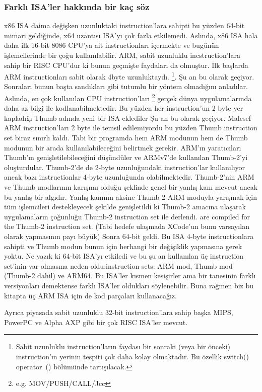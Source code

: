 %
%
%

\subsubsection{Farklı \ac{ISA}'ler hakkında bir kaç söz}
x86 \ac{ISA} daima değişken uzunluktaki instruction'lara sahipti bu yüzden 64-bit mimari geldiğinde, x64 uzantısı \ac{ISA}'yı çok fazla etkilemedi. Aslında, x86 \ac{ISA} hala daha ilk 16-bit 8086 CPU'ya ait instructionları içermekte ve bugünün işlemcilerinde bir çoğu kullanılabilir.
ARM, sabit uzunluklu incstruction'lara sahip bir \ac{RISC} \ac{CPU}'dur ki bunun geçmişte faydaları da olmuştur.
İlk başlarda ARM instructionları sabit olarak 4byte uzunluktaydı.%
\footnote{
Sabit uzunluklu instruction'ların faydası bir sonraki (veya bir önceki) instruction'ın yerinin tespiti çok daha kolay olmaktadır. Bu özellik switch() operator~()  bölümünde tartışılacak.
}.
Şu an bu  olarak geçiyor.
Sonraları bunun başta sandıkları gibi tutumlu bir yöntem olmadığını anladılar.
Aslında, en çok kullanılan \ac{CPU} instruction'ları \footnote{e.g. MOV/PUSH/CALL/Jcc} gerçek dünya uygulamalarında daha az bilgi ile kodlanabilmektedir.
Bu yüzden her instruction'un 2 byte yer kapladığı Thumb adında yeni bir \ac{ISA} eklediler
Şu an bu  olarak geçiyor.
Malesef  ARM instruction'ları 2 byte ile temsil edilemiyordu bu yüzden Thumb instruction set biraz sınırlı kaldı.
Tabi bir programda hem ARM modunun hem de Thumb modunun bir arada kullanılabileceğini belirtmek gerekir.
ARM'ın yaratıcıları Thumb'ın genişletilebileceğini düşündüler ve ARMv7'de kullanılan Thumb-2'yi oluşturdular. 
Thumb-2'de de 2-byte uzunluğundaki instruction'lar kullanılıyor ancak bazı instructionlar 4-byte uzunluğunda olabilmektedir.
Thumb-2'nin ARM ve Thumb modlarının karışımı olduğu şeklinde genel bir yanlış kanı mevcut ancak bu yanlış bir algıdır.
Yanlış kanının aksine Thumb-2 ARM moduyla yarışmak için tüm işlemcileri destekleyecek şekilde genişletildi ki Thumb-2 amacına ulaşarak \idevices uygulamaların çoğunluğu Thumb-2 instruction set ile derlendi.
are compiled for the Thumb-2 instruction set. (Tabi hedefe ulaşmada XCode'un bunu varsayılan olarak yapmasının payı büyük)
Sonra 64-bit geldi. Bu \ac{ISA} 4-byte instructionlara sahipti ve Thumb modun bunun için herhangi bir değişiklik yapmasına gerek yoktu.
Ne yazık ki 64-bit \ac{ISA}'yı etkiledi ve bu şu an kullanılan üç instruction set'inin var olmasına neden oldu:instruction sets: ARM mod, Thumb mod (Thumb-2 dahil) ve ARM64.
Bu \ac{ISA}'ler kısmen kesişirler ama bir tanesinin farklı versiyonları demektense farklı \ac{ISA}'ler oldukları söylenebilir.
Buna rağmen biz bu kitapta üç ARM \ac{ISA} için de kod parçaları kullanacağız.

%
%
%
Ayrıca piyasada sabit uzunluklu 32-bit instruction'lara sahip başka MIPS, PowerPC ve Alpha AXP gibi bir çok \ac{RISC} \ac{ISA}'ler mevcut. 